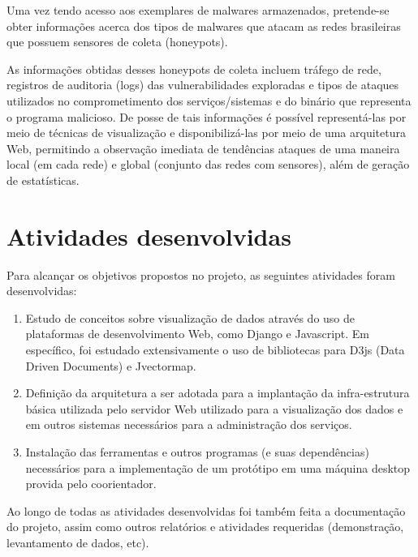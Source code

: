 \documentclass[Portuguese]
{ic-tese-v2}
\begin{document}
Uma vez tendo acesso aos exemplares de malwares armazenados, pretende-se obter informações acerca dos tipos de malwares que atacam as redes brasileiras que possuem sensores de coleta (honeypots). 

As informações obtidas desses honeypots de coleta incluem tráfego de rede, registros de auditoria (logs) das vulnerabilidades exploradas e tipos de ataques utilizados no comprometimento dos serviços/sistemas e do binário que representa o programa malicioso. De posse de tais informações é possível representá-las  por meio de técnicas de visualização e disponibilizá-las por meio de uma arquitetura Web, permitindo a observação imediata de tendências ataques de uma maneira local (em cada rede) e global (conjunto das redes com sensores), além de geração de estatísticas.


\chapter{Atividades desenvolvidas}

Para alcançar os objetivos propostos no projeto, as seguintes atividades foram desenvolvidas:

\begin{enumerate}
\item Estudo de conceitos sobre visualização de dados através do uso de plataformas de desenvolvimento Web, como Django e Javascript. Em específico, foi estudado extensivamente o uso de bibliotecas para D3js\cite{d3js} (Data Driven Documents) e Jvectormap.\\
\item Definição da arquitetura a ser adotada para a implantação da infra-estrutura básica utilizada pelo servidor Web utilizado para a visualização dos dados e em outros sistemas necessários para a administração dos serviços.\\
\item Instalação das ferramentas e outros programas (e suas dependências) necessários para a implementação de um protótipo em uma máquina desktop provida pelo coorientador.\\
\end{enumerate}

Ao longo de todas as atividades desenvolvidas foi també́m feita a documentação do projeto, assim como outros relatórios e atividades requeridas (demonstração, levantamento de dados, etc).
\end{document}

